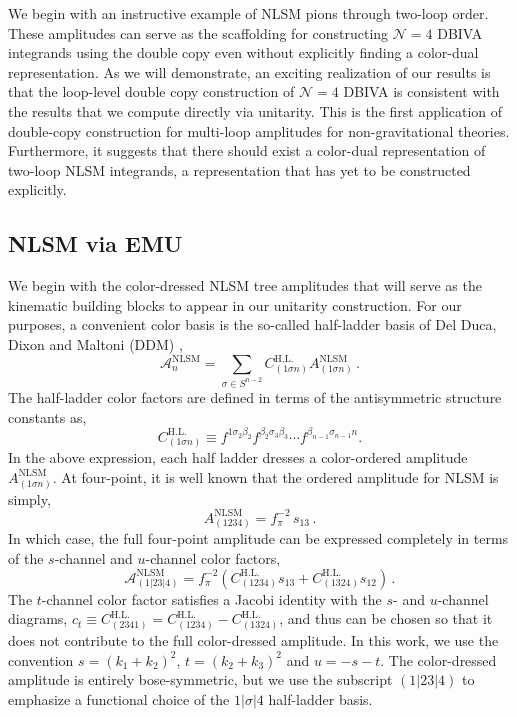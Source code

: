 \documentclass[11pt,letter]{article}
\newcommand{\cHL}[0]{C^{\text{H.L.}}}
\begin{document}
We begin with an instructive example of NLSM pions through two-loop order. These amplitudes can serve as the scaffolding for constructing $\mathcal{N}=4$ DBIVA integrands using the double copy even without explicitly finding a color-dual representation. As we will demonstrate, an exciting realization of our results is that the loop-level double copy construction of $\mathcal{N}=4$ DBIVA is consistent with the results that we compute directly via unitarity. This is the first application of double-copy construction for multi-loop amplitudes for non-gravitational theories. Furthermore, it suggests that there should exist a color-dual representation of two-loop NLSM integrands, a representation that has yet to be constructed explicitly. 

\subsection{NLSM via EMU}\label{sec:NLSMU}

We begin with the color-dressed NLSM tree amplitudes that will serve as the kinematic building blocks to appear in our unitarity construction. For our purposes, a convenient color basis is the so-called half-ladder basis of Del Duca, Dixon and Maltoni (DDM) \cite{DixonMaltoni},
\begin{equation}
\mathcal{A}^{\text{NLSM}}_n = \sum_{\sigma \in S^{n-2}}\cHL_{(1\sigma n)} A^{\text{NLSM}}_{(1\sigma n)}\,.
\end{equation}
The half-ladder color factors are defined in terms of the antisymmetric structure constants as, 
\begin{equation}
\cHL_{(1\sigma n)} \equiv f^{1\sigma_2 \beta_2}f^{\beta_2 \sigma_3 \beta_3} \cdots f^{\beta_{n-1}\sigma_{n-1}n}.
\end{equation} 
In the above expression, each half ladder dresses a color-ordered amplitude $A^{\text{NLSM}}_{(1\sigma n)}$. At four-point, it is well known that the ordered amplitude for NLSM is simply, 
\begin{equation}
A^{\text{NLSM}}_{(1234)} = f_\pi^{-2} \,s_{13}\,.
\end{equation}
In which case, the full four-point amplitude can be expressed completely in terms of the $s$-channel and $u$-channel color factors, 
\begin{equation}\label{eq:NLSMamp} 
\mathcal{A}^{\text{NLSM}}_{(1|23|4)} = f_\pi^{-2}\left(\cHL_{(1234)} s_{13}+\cHL_{(1324)}s_{12}\right)\,.
\end{equation}
The $t$-channel color factor satisfies a Jacobi identity with the $s$- and $u$-channel diagrams, $c_t \equiv\cHL_{(2341)} =\cHL_{(1234)}-\cHL_{(1324)}$, and thus can be chosen so that it does not contribute to the full color-dressed amplitude. In this work, we use the convention $s=(k_1+k_2)^2$, $t=(k_2+k_3)^2$ and $u=-s-t$.  The color-dressed amplitude is entirely bose-symmetric, but we use the subscript $(1|23|4)$ to emphasize a functional choice of the $1|\sigma|4$ half-ladder basis.
\end{document}

